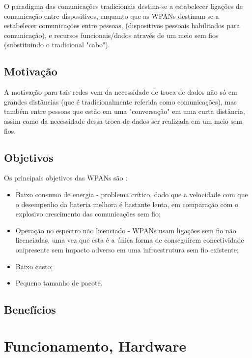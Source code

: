 \documentclass[conference]{IEEEtran}
\begin{document}
O paradigma das comunicações tradicionais destina-se a estabelecer ligações de comunicação entre dispositivos, enquanto que as WPANs destinam-se a estabelecer comunicações entre pessoas, (dispositivos pessoais habilitados para comunicação), e recursos funcionais/dados através de um meio sem fios (substituindo o tradicional "cabo").




\subsection{Motivação}

A motivação para tais redes vem da necessidade de troca de dados não só em grandes distâncias (que é tradicionalmente referida como comunicações), mas também entre pessoas que estão em uma "conversação" em uma curta distância, assim como da necessidade dessa troca de dados ser realizada em um meio sem fios.


\subsection{Objetivos}

Os principais objetivos das WPANs são \cite{prasad2004ofdm}:

\begin{itemize}
 \item Baixo consumo de energia - problema crítico, dado que a velocidade com que o desempenho da bateria melhora é bastante lenta, em comparação com o explosivo crescimento das comunicações sem fio;
 \item Operação no espectro não licenciado - WPANs usam ligações sem fio não licenciadas, uma vez que esta é a única forma de conseguirem conectividade onipresente sem impacto adverso em uma infraestrutura sem fio existente;
 \item Baixo custo;
 \item Pequeno tamanho de pacote.
\end{itemize}

\subsection{Benefícios}



\section{Funcionamento, Hardware}
\end{document}
